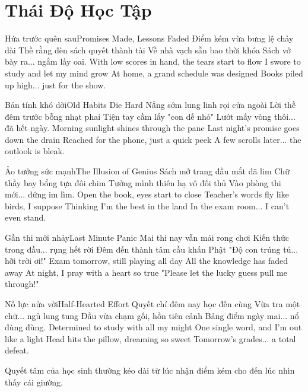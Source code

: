 \chapter{Thái Độ Học Tập}

\begin{tutuyetbox}{Hứa trước quên sau}{Promises Made, Lessons Faded}
Điểm kém vừa bưng lệ chảy dài
Thề rằng đèn sách quyết thành tài
Về nhà vạch sẵn bao thời khóa
Sách vở bày ra... ngắm lấy oai.
\tcblower
With low scores in hand, the tears start to flow 
I swore to study and let my mind grow 
At home, a grand schedule was designed 
Books piled up high... just for the show.
\end{tutuyetbox}

\begin{tutuyetbox}{Bản tính khó dời}{Old Habits Die Hard}
Nắng sớm lung linh rọi cửa ngoài
Lời thề đêm trước bỗng nhạt phai
Tiện tay cầm lấy "con dế nhỏ"
Lướt mấy vòng thôi... đã hết ngày.
\tcblower
Morning sunlight shines through the pane 
Last night's promise goes down the drain 
Reached for the phone, just a quick peek 
A few scrolls later... the outlook is bleak.
\end{tutuyetbox}

\begin{tutuyetbox}{Ảo tưởng sức mạnh}{The Illusion of Genius}
Sách mở trang đầu mắt đã lim
Chữ thầy bay bổng tựa đôi chim
Tưởng mình thiên hạ vô đối thủ
Vào phòng thi mới... đứng im lìm.
\tcblower
Open the book, eyes start to close 
Teacher's words fly like birds, I suppose 
Thinking I'm the best in the land 
In the exam room... I can't even stand.
\end{tutuyetbox}

\begin{tutuyetbox}{Gần thi mới nhảy}{Last Minute Panic}
Mai thi nay vẫn mải rong chơi
Kiến thức trong đầu... rụng hết rời
Đêm đến thành tâm cầu khấn Phật
"Độ con trúng tủ... hỡi trời ơi!"
\tcblower
Exam tomorrow, still playing all day 
All the knowledge has faded away 
At night, I pray with a heart so true 
"Please let the lucky guess pull me through!"
\end{tutuyetbox}

\begin{tutuyetbox}{Nỗ lực nửa vời}{Half-Hearted Effort}
Quyết chí đêm nay học đến cùng
Vừa tra một chữ... ngủ lung tung
Đầu vừa chạm gối, hồn tiên cảnh
Bảng điểm ngày mai... nổ đùng đùng.
\tcblower
Determined to study with all my might 
One single word, and I'm out like a light 
Head hits the pillow, dreaming so sweet 
Tomorrow's grades... a total defeat.
\end{tutuyetbox}

\begin{ghichu}
Quyết tâm của học sinh thường kéo dài từ lúc nhận điểm kém cho đến lúc nhìn thấy cái giường.
\end{ghichu}